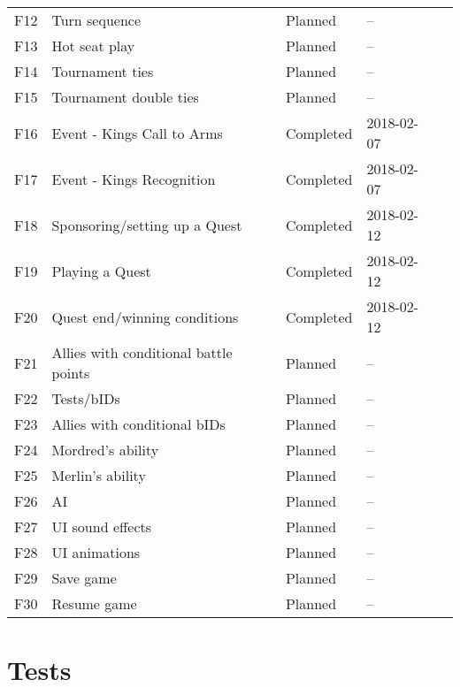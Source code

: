 \documentclass[10pt,a4paper]{article}
\begin{document}
\begin{center}
\begin{tabularx}{\linewidth}{l X X l l}
F12 & Turn sequence & Planned & --\\
F13 & Hot seat play & Planned & --\\
F14 & Tournament ties & Planned & --\\
F15 & Tournament double ties & Planned & --\\
F16 & Event - Kings Call to Arms & Completed & 2018-02-07\\
F17 & Event - Kings Recognition & Completed & 2018-02-07\\
F18 & Sponsoring/setting up a Quest & Completed & 2018-02-12\\
F19 & Playing a Quest & Completed & 2018-02-12\\
F20 & Quest end/winning conditions & Completed & 2018-02-12\\
F21 & Allies with conditional battle points & Planned & --\\
F22 & Tests/bIDs & Planned & --\\
F23 & Allies with conditional bIDs & Planned & --\\
F24 & Mordred's ability & Planned & --\\
F25 & Merlin's ability & Planned & --\\
F26 & AI & Planned & --\\
F27 & UI sound effects & Planned & --\\
F28 & UI animations & Planned & --\\
F29 & Save game & Planned & --\\
F30 & Resume game & Planned & --\\
\end{tabularx}
\end{center}

\section*{Tests}
\end{document}
